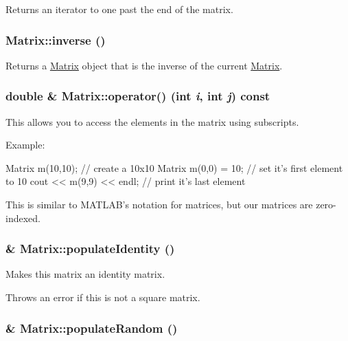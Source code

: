 Returns an iterator to one past the end of the matrix. 

\hypertarget{class_matrix_ac4f5e7d4bb1bfd6586bd3384bd2a02b0}{
\subsubsection[{inverse}]{ Matrix::inverse ()}}
\label{class_matrix_ac4f5e7d4bb1bfd6586bd3384bd2a02b0}


Returns a \hyperlink{class_matrix}{Matrix} object that is the inverse of the current \hyperlink{class_matrix}{Matrix}. 

\hypertarget{class_matrix_a3d361fded5f8992d2202894ca141eb72}{
\subsubsection[{operator()}]{\setlength{\rightskip}{0pt plus 5cm}double \& Matrix::operator() (int {\em i}, \/  int {\em j}) const}}
\label{class_matrix_a3d361fded5f8992d2202894ca141eb72}


This allows you to access the elements in the matrix using subscripts. 

Example: 
\begin{DoxyCode}
                Matrix m(10,10);        // create a 10x10 Matrix
                m(0,0) = 10;            // set it's first element to 10
                cout << m(9,9) << endl; // print it's last element
\end{DoxyCode}
 This is similar to MATLAB's notation for matrices, but our matrices are zero-\/indexed. \hypertarget{class_matrix_a0ee71091770a4e83e54860f291ef1b7d}{
\subsubsection[{populateIdentity}]{ \& Matrix::populateIdentity ()}}
\label{class_matrix_a0ee71091770a4e83e54860f291ef1b7d}


Makes this matrix an identity matrix. 

Throws an error if this is not a square matrix. \hypertarget{class_matrix_a375fc575a7e042d0eed3d76c7470e59f}{
\subsubsection[{populateRandom}]{ \& Matrix::populateRandom ()}}
\label{class_matrix_a375fc575a7e042d0eed3d76c7470e59f}


